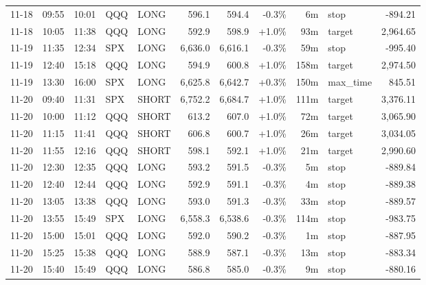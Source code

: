 \documentclass[11pt,a4paper,twoside]{article}
\begin{document}
\begin{center}
\begin{longtable}{>{\color{txtmain}}l l l l l r r r r >{\color{txtmain}}l r}
11-18 & 09:55 & 10:01 & QQQ & LONG & 596.1 & 594.4 & \textcolor{lossred}{-0.3\%} & 6m & stop & \textcolor{lossred}{-894.21} \\
11-18 & 10:05 & 11:38 & QQQ & LONG & 592.9 & 598.9 & \textcolor{wingreen}{+1.0\%} & 93m & target & \textcolor{wingreen}{2,964.65} \\
11-19 & 11:35 & 12:34 & SPX & LONG & 6,636.0 & 6,616.1 & \textcolor{lossred}{-0.3\%} & 59m & stop & \textcolor{lossred}{-995.40} \\
11-19 & 12:40 & 15:18 & QQQ & LONG & 594.9 & 600.8 & \textcolor{wingreen}{+1.0\%} & 158m & target & \textcolor{wingreen}{2,974.50} \\
11-19 & 13:30 & 16:00 & SPX & LONG & 6,625.8 & 6,642.7 & \textcolor{wingreen}{+0.3\%} & 150m & max\_time & \textcolor{wingreen}{845.51} \\
11-20 & 09:40 & 11:31 & SPX & SHORT & 6,752.2 & 6,684.7 & \textcolor{wingreen}{+1.0\%} & 111m & target & \textcolor{wingreen}{3,376.11} \\
11-20 & 10:00 & 11:12 & QQQ & SHORT & 613.2 & 607.0 & \textcolor{wingreen}{+1.0\%} & 72m & target & \textcolor{wingreen}{3,065.90} \\
11-20 & 11:15 & 11:41 & QQQ & SHORT & 606.8 & 600.7 & \textcolor{wingreen}{+1.0\%} & 26m & target & \textcolor{wingreen}{3,034.05} \\
11-20 & 11:55 & 12:16 & QQQ & SHORT & 598.1 & 592.1 & \textcolor{wingreen}{+1.0\%} & 21m & target & \textcolor{wingreen}{2,990.60} \\
11-20 & 12:30 & 12:35 & QQQ & LONG & 593.2 & 591.5 & \textcolor{lossred}{-0.3\%} & 5m & stop & \textcolor{lossred}{-889.84} \\
11-20 & 12:40 & 12:44 & QQQ & LONG & 592.9 & 591.1 & \textcolor{lossred}{-0.3\%} & 4m & stop & \textcolor{lossred}{-889.38} \\
11-20 & 13:05 & 13:38 & QQQ & LONG & 593.0 & 591.3 & \textcolor{lossred}{-0.3\%} & 33m & stop & \textcolor{lossred}{-889.57} \\
11-20 & 13:55 & 15:49 & SPX & LONG & 6,558.3 & 6,538.6 & \textcolor{lossred}{-0.3\%} & 114m & stop & \textcolor{lossred}{-983.75} \\
11-20 & 15:00 & 15:01 & QQQ & LONG & 592.0 & 590.2 & \textcolor{lossred}{-0.3\%} & 1m & stop & \textcolor{lossred}{-887.95} \\
11-20 & 15:25 & 15:38 & QQQ & LONG & 588.9 & 587.1 & \textcolor{lossred}{-0.3\%} & 13m & stop & \textcolor{lossred}{-883.34} \\
11-20 & 15:40 & 15:49 & QQQ & LONG & 586.8 & 585.0 & \textcolor{lossred}{-0.3\%} & 9m & stop & \textcolor{lossred}{-880.16} \\

\end{longtable}
\end{center}
\end{document}
